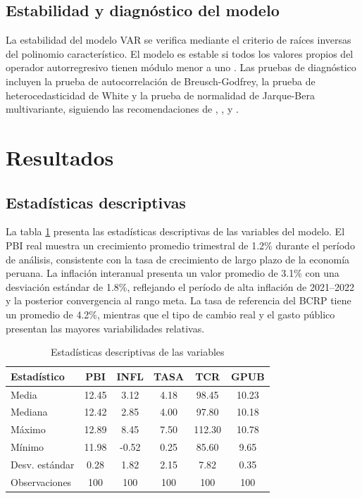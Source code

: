 \documentclass[12pt,a4paper]{article}
\begin{document}
\subsection{Estabilidad y diagnóstico del modelo}

La estabilidad del modelo VAR se verifica mediante el criterio de raíces inversas del polinomio característico. El modelo es estable si todos los valores propios del operador autorregresivo tienen módulo menor a uno \citep{hamilton1994, lutkepohl2005}. Las pruebas de diagnóstico incluyen la prueba de autocorrelación de Breusch-Godfrey, la prueba de heterocedasticidad de White y la prueba de normalidad de Jarque-Bera multivariante, siguiendo las recomendaciones de \citet{johansen1995}, \citet{mackinnon1996}, \citet{davidson2004} y \citet{greene2018}.

\section{Resultados}

\subsection{Estadísticas descriptivas}

La tabla \ref{tab:descriptivas} presenta las estadísticas descriptivas de las variables del modelo. El PBI real muestra un crecimiento promedio trimestral de 1.2\% durante el período de análisis, consistente con la tasa de crecimiento de largo plazo de la economía peruana. La inflación interanual presenta un valor promedio de 3.1\% con una desviación estándar de 1.8\%, reflejando el período de alta inflación de 2021--2022 y la posterior convergencia al rango meta. La tasa de referencia del BCRP tiene un promedio de 4.2\%, mientras que el tipo de cambio real y el gasto público presentan las mayores variabilidades relativas.

\begin{table}[H]
\centering
\caption{Estadísticas descriptivas de las variables}
\label{tab:descriptivas}
\begin{tabular}{lccccc}
\toprule
\textbf{Estadístico} & \textbf{PBI} & \textbf{INFL} & \textbf{TASA} & \textbf{TCR} & \textbf{GPUB}\\
\midrule
Media & 12.45 & 3.12 & 4.18 & 98.45 & 10.23 \\
Mediana & 12.42 & 2.85 & 4.00 & 97.80 & 10.18 \\
Máximo & 12.89 & 8.45 & 7.50 & 112.30 & 10.78 \\
Mínimo & 11.98 & -0.52 & 0.25 & 85.60 & 9.65 \\
Desv. estándar & 0.28 & 1.82 & 2.15 & 7.82 & 0.35 \\
Observaciones & 100 & 100 & 100 & 100 & 100\\
\bottomrule
\end{tabular}
\end{table}
\end{document}
